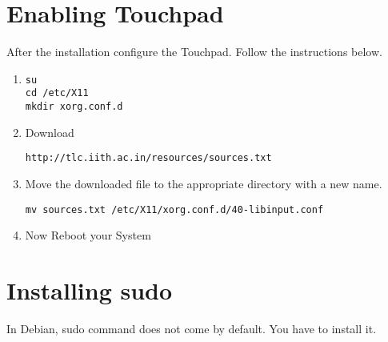 \documentclass[journal,12pt,twocolumn]{IEEEtran}
\begin{document}
\section{Enabling Touchpad} 
After the installation configure the Touchpad. Follow the instructions below.

\begin{enumerate}

\item 
\begin{lstlisting}
su
cd /etc/X11
mkdir xorg.conf.d
\end{lstlisting}
\item Download 
\begin{lstlisting}
http://tlc.iith.ac.in/resources/sources.txt
\end{lstlisting}
\item Move the downloaded file to the appropriate directory with a new name.
\begin{lstlisting}
mv sources.txt /etc/X11/xorg.conf.d/40-libinput.conf 
\end{lstlisting}


%
%
%
%
%    
%    
%
%
\item Now Reboot your System

\end{enumerate}

\section{Installing sudo}
In Debian, sudo command does not come by default. You have to install it.
\end{document}
